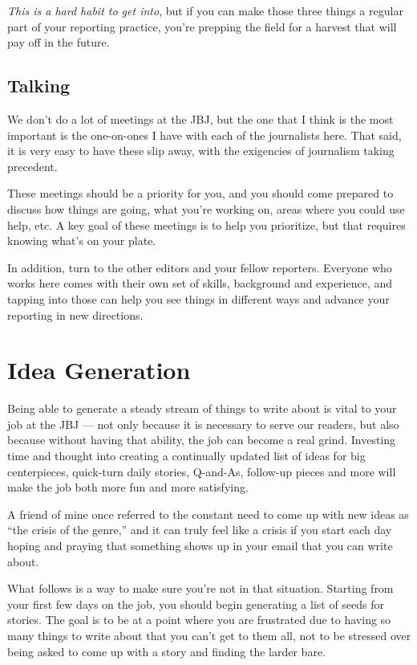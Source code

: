 \documentclass[
  11pt,
  american,
  letterpaperpaper,
  extrafontsizes,onecolumn,openright
  ]{memoir}
\begin{document}
\emph{This is a hard habit to get into}, but if you can make those three things a regular part of your reporting practice, you're prepping the field for a harvest that will pay off in the future.

\hypertarget{talking}{%
\section*{Talking}\label{talking}}

We don't do a lot of meetings at the JBJ, but the one that I think is the most important is the one-on-ones I have with each of the journalists here. That said, it is very easy to have these slip away, with the exigencies of journalism taking precedent.

These meetings should be a priority for you, and you should come prepared to discuss how things are going, what you're working on, areas where you could use help, etc. A key goal of these meetings is to help you prioritize, but that requires knowing what's on your plate.

In addition, turn to the other editors and your fellow reporters. Everyone who works here comes with their own set of skills, background and experience, and tapping into those can help you see things in different ways and advance your reporting in new directions.

\hypertarget{idea-generation}{%
\chapter{Idea Generation}\label{idea-generation}}

Being able to generate a steady stream of things to write about is vital to your job at the JBJ --- not only because it is necessary to serve our readers, but also because without having that ability, the job can become a real grind. Investing time and thought into creating a continually updated list of ideas for big centerpieces, quick-turn daily stories, Q-and-As, follow-up pieces and more will make the job both more fun and more satisfying.

A friend of mine once referred to the constant need to come up with new ideas as \enquote{the crisis of the genre,} and it can truly feel like a crisis if you start each day hoping and praying that something shows up in your email that you can write about.

What follows is a way to make sure you're not in that situation. Starting from your first few days on the job, you should begin generating a list of seeds for stories. The goal is to be at a point where you are frustrated due to having so many things to write about that you can't get to them all, not to be stressed over being asked to come up with a story and finding the larder bare.
\end{document}

